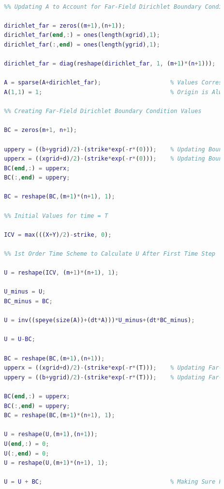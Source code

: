 \documentclass[12pt,letterpaper]{article}
\begin{document}
\begin{lstlisting}[language = Matlab]
        
        %% Updating A to Account for Far-Field Dirichlet Boundary Conditions
        
        dirichlet_far = zeros((m+1),(n+1));
        dirichlet_far(end,:) = ones(length(xgrid),1);
        dirichlet_far(:,end) = ones(length(ygrid),1);
        
        dirichlet_far = diag(reshape(dirichlet_far, 1, (m+1)*(n+1)));
        
        A = sparse(A+dirichlet_far);                    % Values Corresponding to Far-Field Boundary in A Are One on Diagonal
        A(1,1) = 1;                                     % Origin is Always Zero
        
        %% Creating Far-Field Dirichlet Boundary Condition Values
        
        BC = zeros(m+1, n+1);
        
        uppery = ((b+ygrid)/2)-(strike*exp(-r*(0)));    % Updating Boundary Conditions
        upperx = ((xgrid+d)/2)-(strike*exp(-r*(0)));    % Updating Boundary Conditions
        BC(end,:) = upperx;
        BC(:,end) = uppery;
        
        BC = reshape(BC,(m+1)*(n+1), 1);
        
        %% Initial Values for time = T
        
        ICV = max(((X+Y)/2)-strike, 0);
        
        %% 1st Order Time Scheme to Calculate U After First Time Step
        
        U = reshape(ICV, (m+1)*(n+1), 1);
        
        U_minus = U;
        BC_minus = BC;
        
        U = inv((speye(size(A))+(dt*A)))*U_minus+(dt*BC_minus);
        
        U = U-BC;
        
        BC = reshape(BC,(m+1),(n+1));
        upperx = ((xgrid+d)/2)-(strike*exp(-r*(T)));    % Updating Far-Field Boundary Conditions for X
        uppery = ((b+ygrid)/2)-(strike*exp(-r*(T)));    % Updating Far-Field Boundary Conditions for Y
        
        BC(end,:) = upperx;
        BC(:,end) = uppery;
        BC = reshape(BC,(m+1)*(n+1), 1);
        
        U = reshape(U,(m+1),(n+1));
        U(end,:) = 0;
        U(:,end) = 0;
        U = reshape(U,(m+1)*(n+1), 1);
        
        U = U + BC;                                     % Making Sure Far-Field Boundaries Have Correct Value in Case of Rounding Error
        

\end{lstlisting}
\end{document}
